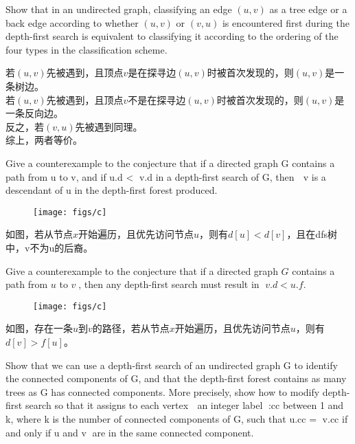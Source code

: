 \documentclass[a4paper, justified]{tufte-handout}
\begin{document}
\begin{problem}
Show that in an undirected graph, classifying an edge $(u,v)$ as a tree edge or a back edge according to whether $(u,v)$ or $(v,u)$ is encountered first during the depth-first search is equivalent to classifying it according to the ordering of the four types in the classification scheme.
\end{problem}

\begin{solution}
若$(u,v)$先被遇到，且顶点$v$是在探寻边$(u,v)$时被首次发现的，则$(u,v)$是一条树边。\\
若$(u,v)$先被遇到，且顶点$v$不是在探寻边$(u,v)$时被首次发现的，则$(u,v)$是一条反向边。\\
反之，若$(v,u)$先被遇到同理。\\
综上，两者等价。
\end{solution}


\begin{problem}[TC 22.3-8]
Give a counterexample to the conjecture that if a directed graph G contains a path from u to v, and if u.d < 􏰁v.d in a depth-first search of G, then 􏰁 v is a descendant of u in the depth-first forest produced.
\end{problem}

\begin{solution}
 \begin{figure}[htbp]
    \centering
    \texttt{[image: figs/c]}
  \end{figure}
  如图，若从节点$x$开始遍历，且优先访问节点$u$，则有$d[u]<d[v]$，且在dfs树中，v不为u的后裔。
\end{solution}
\newpage
\begin{problem}[TC 22.3-9]
Give a counterexample to the conjecture that if a directed graph $G$ contains a path from $u$ to $v$􏰁, then any depth-first search must result in 􏰁$v.d < u.f$.
\end{problem}

\begin{solution}
 \begin{figure}[htbp]
    \centering
    \texttt{[image: figs/c]}
  \end{figure}
  如图，存在一条$u$到$v$的路径，若从节点$x$开始遍历，且优先访问节点$u$，则有$d[v]>f[u]$。
\end{solution}

\begin{problem}[TC 22.3-12]
Show that we can use a depth-first search of an undirected graph G to identify the connected components of G, and that the depth-first forest contains as many trees as G has connected components. More precisely, show how to modify depth-first search so that it assigns to each vertex 􏰁 an integer label 􏰁:cc between 1 and k, where k is the number of connected components of G, such that u.cc = 􏰁v.cc if and only if u and v􏰁 are in the same connected component.
\end{problem}
\end{document}
